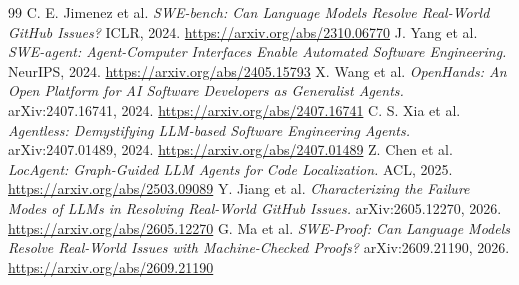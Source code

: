 \documentclass[10pt,twocolumn]{article}
\begin{document}
\begin{thebibliography}{99}
\footnotesize
\setlength{\itemsep}{0pt}
\setlength{\parskip}{0pt}
 C. E. Jimenez et al. \emph{SWE-bench: Can Language Models Resolve Real-World GitHub Issues?} ICLR, 2024. \url{https://arxiv.org/abs/2310.06770}
 J. Yang et al. \emph{SWE-agent: Agent-Computer Interfaces Enable Automated Software Engineering.} NeurIPS, 2024. \url{https://arxiv.org/abs/2405.15793}
 X. Wang et al. \emph{OpenHands: An Open Platform for AI Software Developers as Generalist Agents.} arXiv:2407.16741, 2024. \url{https://arxiv.org/abs/2407.16741}
 C. S. Xia et al. \emph{Agentless: Demystifying LLM-based Software Engineering Agents.} arXiv:2407.01489, 2024. \url{https://arxiv.org/abs/2407.01489}
 Z. Chen et al. \emph{LocAgent: Graph-Guided LLM Agents for Code Localization.} ACL, 2025. \url{https://arxiv.org/abs/2503.09089}
 Y. Jiang et al. \emph{Characterizing the Failure Modes of LLMs in Resolving Real-World GitHub Issues.} arXiv:2605.12270, 2026. \url{https://arxiv.org/abs/2605.12270}
 G. Ma et al. \emph{SWE-Proof: Can Language Models Resolve Real-World Issues with Machine-Checked Proofs?} arXiv:2609.21190, 2026. \url{https://arxiv.org/abs/2609.21190}
\end{thebibliography}
\end{document}
